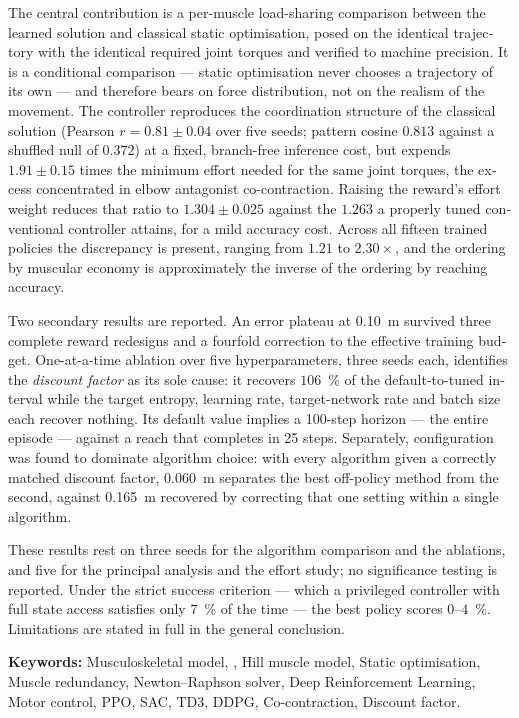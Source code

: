 \begin{otherlanguage}{english}
The central contribution is a per-muscle load-sharing comparison between the
learned solution and classical static optimisation, posed on the identical
trajectory with the identical required joint torques and verified to machine
precision. It is a conditional comparison --- static optimisation never chooses a
trajectory of its own --- and therefore bears on force distribution, not on the
realism of the movement. The
controller reproduces the coordination structure of the classical solution
(Pearson $r = 0.81 \pm 0.04$ over five seeds; pattern cosine $0.813$ against a
shuffled null of $0.372$) at a fixed, branch-free inference cost, but expends
$1.91 \pm 0.15$ times the minimum effort needed for the same joint torques, the
excess concentrated in elbow antagonist co-contraction. Raising the reward's
effort weight reduces that ratio to $1.304 \pm 0.025$ against the $1.263$ a
properly tuned conventional controller attains, for a mild accuracy cost.
Across all fifteen trained policies the discrepancy is present, ranging from
$1.21$ to $2.30\times$, and the ordering by muscular economy is approximately the
inverse of the ordering by reaching accuracy.

Two secondary results are reported. An error plateau at \SI{0.10}{\meter}
survived three complete reward redesigns and a fourfold correction to the
effective training budget. One-at-a-time ablation over five hyperparameters,
three seeds each, identifies the \emph{discount factor} as its sole cause: it
recovers $106$~\% of the default-to-tuned interval while the target entropy,
learning rate, target-network rate and batch size each recover nothing. Its
default value implies a 100-step horizon --- the entire episode --- against a
reach that completes in 25 steps. Separately, configuration was found to dominate algorithm choice: with every
algorithm given a correctly matched discount factor, \SI{0.060}{\meter} separates
the best off-policy method from the second, against \SI{0.165}{\meter} recovered
by correcting that one setting within a single algorithm.

These results rest on three seeds for the algorithm comparison and the
ablations, and five for the principal analysis and the effort study; no
significance testing is reported. Under the strict
success criterion --- which a privileged controller with full state access
satisfies only $7$~\% of the time --- the best policy scores $0$--$4$~\%.
Limitations are stated in full in the general conclusion.

\bigskip
\noindent\textbf{Keywords:} Musculoskeletal model, \MuJoCo{}, Hill muscle model,
Static optimisation, Muscle redundancy, Newton--Raphson solver, Deep
Reinforcement Learning, Motor control, PPO, SAC, TD3, DDPG,
Co-contraction, Discount factor.
\end{otherlanguage}

